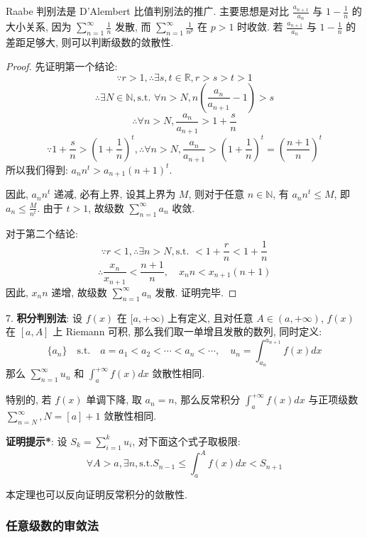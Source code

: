 \documentclass[a4paper,12pt]{ctexart}
\begin{document}
Raabe 判别法是 D'Alembert 比值判别法的推广. 主要思想是对比 $\frac{a_{n+1}}{a_n}$ 与 $1 - \frac{1}{n}$ 的大小关系, 因为 $\sum_{n=1}^{\infty} \frac{1}{n}$ 发散, 而 $\sum_{n=1}^{\infty} \frac{1}{n^p}$ 在 $p > 1$ 时收敛. 若 $\frac{a_{n+1}}{a_n}$ 与 $1 - \frac{1}{n}$ 的差距足够大, 则可以判断级数的敛散性.

\begin{proof}
先证明第一个结论: 
$$ \because r > 1, \therefore \exists s,t \in \mathbb{R}, r > s > t > 1 $$
$$ \therefore \exists N \in \mathbb{N}, \text{s.t. } \forall n > N, n\left(\frac{a_n}{a_{n+1}} - 1\right) > s $$
$$ \therefore \forall n > N, \frac{a_n}{a_{n+1}} > 1 + \frac{s}{n} $$
$$ \because 1 + \frac{s}{n} > \left(1 + \frac{1}{n}\right)^t, \therefore \forall n > N, \frac{a_n}{a_{n+1}} > \left(1 + \frac{1}{n}\right)^t = \left(\frac{n+1}{n}\right)^t $$
所以我们得到: $a_n n^t > a_{n+1} (n+1)^t$.

因此, $a_n n^t$ 递减, 必有上界, 设其上界为 $M$, 则对于任意 $n \in \mathbb{N}$, 有 $a_n n^t \leq M$, 即 $a_n \leq \frac{M}{n^t}$. 由于 $t > 1$, 故级数 $\sum_{n=1}^{\infty} a_n$ 收敛.

对于第二个结论:
$$ \because r < 1, \therefore \exists n > N, \text{s.t. } < 1+\frac{r}{n} < 1 + \frac{1}{n}
$$
$$
\therefore \frac{x_n}{x_{n+1}} < \frac{n+1}{n}, \quad x_n n < x_{n+1} (n+1)
$$
因此, $x_n n$ 递增, 故级数 $\sum_{n=1}^{\infty} a_n$ 发散. 证明完毕.
\end{proof}

7. \textbf{积分判别法}: 设 $f(x)$ 在 $[a,+\infty)$ 上有定义, 且对任意 $A\in (a,+\infty)$, $f(x)$ 在 $[a,A]$ 上 Riemann 可积, 那么我们取一单增且发散的数列, 同时定义:
   $$
   \{a_n\} \quad \text{s.t.} \quad a = a_1 < a_2 < \cdots < a_n < \cdots,  \quad
   u_n = \int_{a_n}^{a_{n+1}}f(x)dx
   $$
   那么 $\sum_{n=1}^{\infty} u_n$ 和 $\int_{a}^{+\infty}f(x)dx$ 敛散性相同.

   特别的, 若 $f(x)$ 单调下降, 取 $a_n = n$, 那么反常积分 $\int_a^{+\infty} f(x)dx$ 与正项级数 $\sum_{n=N}^{\infty}, N = [a]+1$ 敛散性相同.

   \textbf{证明提示*}: 设 $S_k = \sum_{i=1}^{k} u_i$, 对下面这个式子取极限:
   $$\forall A > a, \exists n, \text{s.t.} S_{n-1} \leq \int_a^Af(x)dx < S_{n+1}$$

   本定理也可以反向证明反常积分的敛散性.

\subsubsection{任意级数的审敛法}
\end{document}

